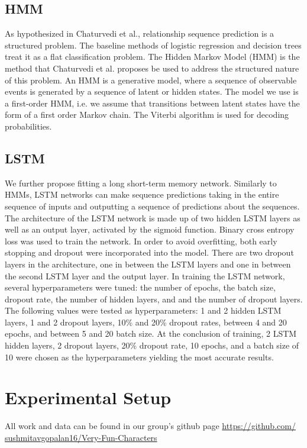 \documentclass[11pt,a4paper]{article}
\begin{document}
\subsection{HMM}
As hypothesized in Chaturvedi et al., relationship sequence prediction is a structured problem. The baseline methods of logistic regression and decision trees treat it as a flat classification problem. The Hidden Markov Model (HMM) is the method that Chaturvedi et al. proposes be used to address the structured nature of this problem. An HMM is a generative model, where a sequence of observable events is generated by a sequence of latent or hidden states. The model we use is a first-order HMM, i.e. we assume that transitions between latent states have the form of a first order Markov chain. The Viterbi algorithm is used for decoding probabilities.

\subsection{LSTM}
We further propose fitting a long short-term memory network. Similarly to HMMs, LSTM networks can make sequence predictions taking in the entire sequence of inputs and outputting a sequence of predictions about the sequences. 
The architecture of the LSTM network is made up of two hidden LSTM layers as well as an output layer, activated by the sigmoid function. Binary cross entropy loss was used to train the network. In order to avoid overfitting, both early stopping and dropout were incorporated into the model. There are two dropout layers in the architecture, one in between the LSTM layers and one in between the second LSTM layer and the output layer.
In training the LSTM network, several hyperparameters were tuned: the number of epochs, the batch size, dropout rate, the number of hidden layers, and and the number of dropout layers. The following values were tested as hyperparameters: 1 and 2 hidden LSTM layers, 1 and 2 dropout layers, 10\% and 20\% dropout rates, between 4 and 20 epochs, and between 5 and 20 batch size. At the conclusion of training, 2 LSTM hidden layers, 2 dropout layers, 20\% dropout rate, 10 epochs, and a batch size of 10 were chosen as the hyperparameters yielding the most accurate results.

\section{Experimental Setup}

All work and data can be found in our group's github page \underline{https://github.com/} \underline{sushmitavgopalan16/Very-Fun-Characters}
\end{document}
